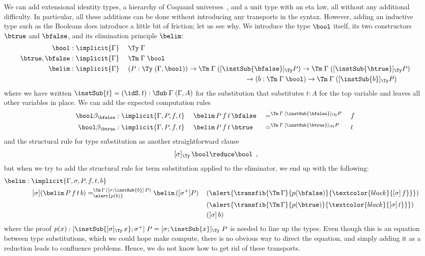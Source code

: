 \documentclass[a4paper,UKenglish,numberwithinsect,cleveref,thm-restate]{lipics-v2021}
\begin{document}
We can add extensional identity types, a hierarchy of Coquand universes~\cite{Coquand2018}, and a unit type with an eta law, all without any additional difficulty. In particular, all these additions can be done without introducing any transports in the syntax. However, adding an inductive type such as the Booleans does introduce a little bit of friction; let us see why. We introduce the type $\bool$ itself, its two constructors $\btrue$ and $\bfalse$, and its elimination principle $\belim$:
%
\begin{alignat*}{3}
  \bool     &: \implicit{\Gamma}         \;  && \Ty\;\Gamma \\
  \btrue, \bfalse &: \implicit{\Gamma}   \;  && \Tm\;\Gamma\;\bool \\
  \belim &: \implicit{\Gamma} \; && (P : \Ty\;(\Gamma , \bool)) \to \Tm\;\Gamma\;([ \instSub{\bfalse} ]_{\Ty} P) \to \Tm\;\Gamma\;([ \instSub{\btrue} ]_{\Ty} P) \\
  &&& \qquad\qquad\qquad\qquad\qquad\qquad\qquad\qquad\quad \to (b : \Tm\;\Gamma\;\bool) \to \Tm\;\Gamma\;([ \instSub{b} ]_{\Ty} P)
\end{alignat*}
%
where we have written $\instSub{t} = (\idS, t) : \Sub\;\Gamma\;(\Gamma, A)$ for the substitution that substitutes $t : A$ for the top variable and leaves all other variables in place. We can add the expected computation rules
%
\begin{alignat*}{5}
  \bool\beta_{\bfalse}           & : \implicit{\Gamma, P, f, t}\; && \belim\,P\,f\,t\,\bfalse && =^{\Tm\;\Gamma\;[\instSub{\bfalse}]_{\Ty} P} {} && f \\
  \bool\beta_{\btrue}           & : \implicit{\Gamma, P, f, t}\; && \belim\,P\,f\,t\,\btrue && =^{\Tm\;\Gamma\;[\instSub{\btrue}]_{\Ty} P} {} && t
\end{alignat*}
%
and the structural rule for type substitution as another straightforward clause
\[
  \;[ \sigma ]_{\Ty}\,\bool \reduce \bool \enspace ,
\]
but when we try to add the structural rule for term substitution applied to the eliminator, we end up with the following:
%
\begin{alignat*}{5}
  []\belim & : \implicit{\Gamma, \sigma, P, f, t, b}\; \\ & \quad [ \sigma ] (\belim\,P\,f\,t\,b) =^{\Tm\,\Gamma\,([ \sigma; \instSub{b} ]\,P)}_{\alert{p(b)}} \belim\,([ \sigma^+ ] P)\,&&(\alert{\transfib{\Tm\,\Gamma}{p(\bfalse)}{\textcolor{black}{[ \sigma ]\,f}}}) \\&&&(\alert{\transfib{\Tm\,\Gamma}{p(\btrue)}{\textcolor{black}{[ \sigma ]\,t}}})\\&&&([\sigma ]\,b)
\end{alignat*}
where the proof $p(x) : [ \instSub{[ \sigma ]_{\Ty}\,x} ; \sigma^+ ]\;P = [ \sigma ; \instSub{x} ]_{\Ty}\;P$ is needed to line up the types. Even though this is an equation between type substitutions, which we could hope make compute, there is no obvious way to direct the equation, and simply adding it as a reduction leads to confluence problems. Hence, we do not know how to get rid of these transports.
\end{document}
